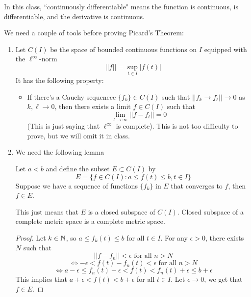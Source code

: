 \documentclass{article}
\begin{document}
\begin{remark}
    In this class, ``continuously differentiable" means the function is continuous, is differentiable, and the derivative is continuous.
\end{remark}

We need a couple of tools before proving Picard's Theorem:
\begin{enumerate}
    \item Let $C(I)$ be the space of bounded continuous functions on $I$ equipped with the $\ell^\infty$-norm
    \[||f|| = \sup_{t \in I} |f(t)|\]
    It has the following property:
    \begin{itemize}
        \item If there's a Cauchy sequenece $\{f_k\} \in C(I)$ such that $||f_k \to f_\ell|| \to 0$ as $k, \ell \to 0$, then there exists a limit $f \in C(I)$ such that
        \[\lim_{t \to \infty} ||f - f_t|| = 0\]
        (This is just saying that $\ell^\infty$ is complete). This is not too difficulty to prove, but we will omit it in class.
    \end{itemize}
    \item We need the following lemma
    \begin{lemma}
        Let $a < b$ and define the subset $E \subset C(I)$ by
        \[E = \{ f \in C(I) : a \leq f(t) \leq b, t \in I \}\]
        Suppose we have a sequence of functions $\{f_k\}$ in $E$ that converges to $f$, then $f \in E$.
    \end{lemma}

    \begin{remark}
        This just means that $E$ is a closed subspace of $C(I)$. Closed subspace of a complete metric space is a complete metric space.
    \end{remark}

    \begin{proof}
        Let $k \in \mathbb{N}$, so $a \leq f_k(t) \leq b$ for all $t \in I$. For any $\epsilon > 0$, there exists $N$ such that
        \[|| f - f_n || < \epsilon \text{ for all $n > N$}\]
        \[\iff -\epsilon < f(t) - f_n(t) < \epsilon \text{ for all $n > N$}\]
        \[\iff a - \epsilon \leq f_n(t) - \epsilon < f(t) < f_n(t) + \epsilon \leq b + \epsilon\]
        This implies that $a + \epsilon < f(t) < b + \epsilon$ for all $t \in I$. Let $\epsilon \to 0$, we get that $f \in E$.
    \end{proof}
\end{enumerate}
\end{document}
